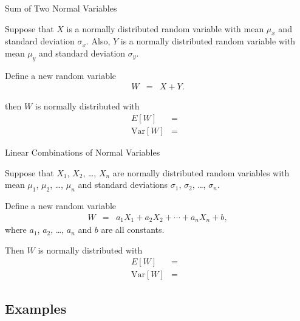 \begin{frame}{Sum of Two Normal Variables}

  \vfill

  Suppose that $X$ is a normally distributed random variable with mean
  $\mu_x$ and standard deviation $\sigma_x$. Also, $Y$ is a normally
  distributed random variable with mean $\mu_y$ and standard deviation
  $\sigma_y$. 

  \vfill

  Define a new random variable
  \begin{eqnarray*}
    W & = & X + Y.
  \end{eqnarray*}

  \vfill

  \textit{} then $W$ is
  normally distributed with
  \begin{eqnarray*}
    E[W] & = & \\
    \mathrm{Var}[W] & = & 
  \end{eqnarray*}

  \vfill
  
\end{frame}

\begin{frame}{Linear Combinations of Normal Variables}
  
  \vfill

  Suppose that $X_1$, $X_2$, \ldots, $X_n$ are 
  normally distributed random variables with mean $\mu_1$, $\mu_2$,
  \dots, $\mu_n$ and standard deviations $\sigma_1$, $\sigma_2$,
  \ldots, $\sigma_n$.

  \vfill

  Define a new random variable
  \begin{eqnarray*}
    W & = & a_1 X_1 + a_2 X_2 + \cdots + a_n X_n + b,
  \end{eqnarray*}
  where $a_1$, $a_2$, \ldots, $a_n$ and $b$ are all constants.

  \vfill

  Then $W$ is normally distributed with
  \begin{eqnarray*}
    E[W] & = & \\
    \mathrm{Var}[W] & = & 
  \end{eqnarray*}

  \vfill
  
\end{frame}


\subsection{Examples}

